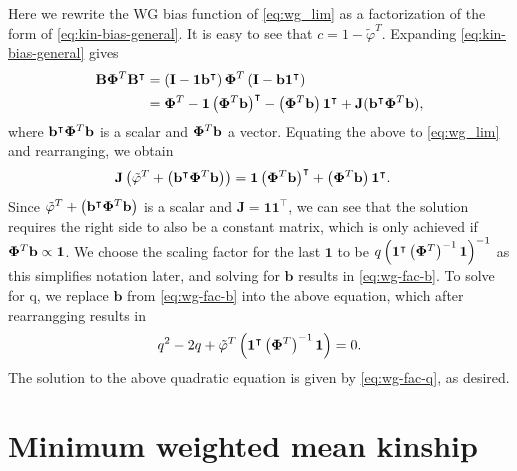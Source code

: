 \documentclass[11pt]{article}
\newcommand{\kinMat}[1][T]{%
  \ensuremath{%
    \mathbf{\Phi}^{#1}
  }%
  \xspace%
}%
\begin{document}
\begin{appendices}
  Here we rewrite the WG bias function of \cref{eq:wg_lim} as a factorization of the form of \cref{eq:kin-bias-general}.
  It is easy to see that $c = 1 - \tilde{\varphi}^T$.
  Expanding \cref{eq:kin-bias-general} gives
  \begin{align*}
    \mathbf{B} \kinMat \mathbf{B}^\intercal
    &= \left( \mathbf{I} - \mathbf{1} \mathbf{b}^\intercal \right) \kinMat \left( \mathbf{I} - \mathbf{b} \mathbf{1}^\intercal \right)
    \\
    &= \kinMat - \mathbf{1} \left( \kinMat \mathbf{b} \right)^\intercal - \left( \kinMat \mathbf{b} \right) \mathbf{1}^\intercal + \mathbf{J}(\mathbf{b}^\intercal \kinMat \mathbf{b} ),
  \end{align*} 
  where $\mathbf{b}^\intercal \kinMat \mathbf{b}$ is a scalar and $\kinMat\mathbf{b}$ a vector.
  Equating the above to \cref{eq:wg_lim} and rearranging, we obtain
  \begin{align*}
    \mathbf{J} \left( \tilde{\varphi}^T + \left( \mathbf{b}^\intercal \kinMat \mathbf{b} \right) \right)
    &= \mathbf{1} \left( \kinMat \mathbf{b} \right)^\intercal + \left( \kinMat\mathbf{b} \right) \mathbf{1}^\intercal .
  \end{align*}
  Since $\tilde{\varphi}^T + \left( \mathbf{b}^\intercal \kinMat \mathbf{b} \right)$ is a scalar and $\mathbf{J} = \mathbf{1} \mathbf{1}^\intercal$, we can see that the solution requires the right side to also be a constant matrix, which is only achieved if $\kinMat\mathbf{b} \propto \mathbf{1}$.
  We choose the scaling factor for the last $\mathbf{1}$ to be $q \left( \mathbf{1}^\intercal \left( \kinMat \right)^{-1} \mathbf{1} \right)^{-1}$ as this simplifies notation later, and solving for $\mathbf{b}$ results in \cref{eq:wg-fac-b}.
  To solve for q, we replace $\mathbf{b}$ from \cref{eq:wg-fac-b} into the above equation, which after rearrangging results in
  \begin{align*}
    q^2 - 2q + \tilde{\varphi}^T \left( \mathbf{1}^\intercal \left( \kinMat \right)^{-1} \mathbf{1} \right) = 0.
  \end{align*}
  The solution to the above quadratic equation is given by \cref{eq:wg-fac-q}, as desired.

  \section{Minimum weighted mean kinship}

  \label{sec:min_w_mean_kin}


\end{appendices}
\end{document}
